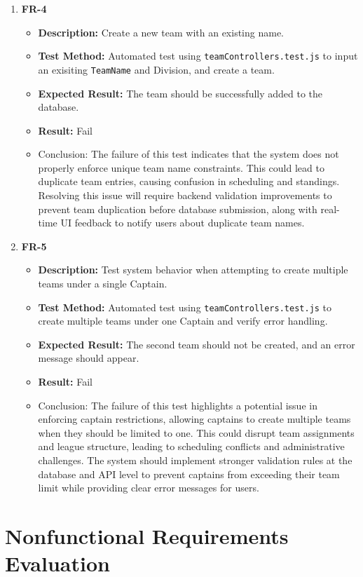 \documentclass[12pt, titlepage]{article}
\begin{document}
\begin{enumerate}
    \item \textbf{FR-4}  
    \begin{itemize}
        \item \textbf{Description:} Create a new team with an existing name.
        \item \textbf{Test Method:} Automated test using \texttt{teamControllers.test.js} to input an exisiting \texttt{TeamName} and Division, and create a team.
        \item \textbf{Expected Result:} The team should be successfully added to the database.
        \item \textbf{Result:} Fail
        \item Conclusion: The failure of this test indicates that the system does not properly enforce unique team name constraints. This could lead to duplicate team entries, causing confusion in scheduling and standings.
		Resolving this issue will require backend validation improvements to prevent team duplication before database submission, along with real-time UI feedback to notify users about duplicate team names.
    \end{itemize}
    \item \textbf{FR-5}  
    \begin{itemize}
        \item \textbf{Description:} Test system behavior when attempting to create multiple teams under a single Captain.
        \item \textbf{Test Method:} Automated test using \texttt{teamControllers.test.js} to create multiple teams under one Captain and verify error handling.
        \item \textbf{Expected Result:} The second team should not be created, and an error message should appear.
        \item \textbf{Result:} Fail 
        \item Conclusion: The failure of this test highlights a potential issue in enforcing captain restrictions, allowing captains to create multiple teams when they should be limited to one.
		This could disrupt team assignments and league structure, leading to scheduling conflicts and administrative challenges.
		The system should implement stronger validation rules at the database and API level to prevent captains from exceeding their team limit while providing clear error messages for users.
    \end{itemize}
\end{enumerate}

\section{Nonfunctional Requirements Evaluation}
\end{document}
